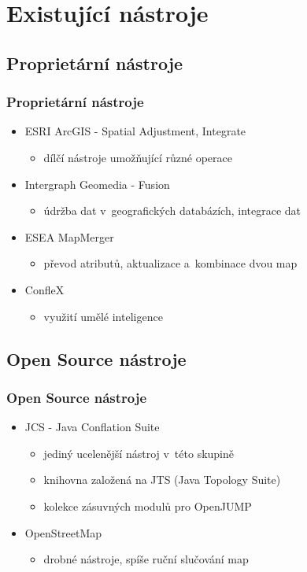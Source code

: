 \documentclass[unicode,bookmarksnumbered]{beamer}
\begin{document}
\section{Existující nástroje} %

  \subsection{Proprietární nástroje}
  \begin{frame}
    \frametitle{Proprietární nástroje}
     \begin{itemize}
      \item ESRI ArcGIS - Spatial Adjustment, Integrate
	  \begin{itemize}
	    \item dílčí nástroje umožňující různé operace
	  \end{itemize}
      \item Intergraph Geomedia - Fusion
	  \begin{itemize}
	    \item údržba dat v~geografických databázích, %
		  integrace dat
	  \end{itemize}
      \item ESEA MapMerger
	  \begin{itemize}
	    \item převod atributů, aktualizace a~kombinace dvou map
	  \end{itemize}
      \item ConfleX
	  \begin{itemize}
	    \item využití umělé inteligence%
	  \end{itemize}
     \end{itemize}
  \end{frame}

  \subsection{Open Source nástroje}
  \begin{frame}
    \frametitle{Open Source nástroje}
	\begin{itemize}
	  \item JCS - Java Conflation Suite
	      \begin{itemize}
		\item jediný ucelenější nástroj v~této skupině
		\item knihovna založená na JTS (Java Topology Suite)
		\item kolekce zásuvných modulů pro OpenJUMP %
	      \end{itemize}
	  \item OpenStreetMap
	      \begin{itemize}
		\item drobné nástroje, spíše ruční slučování map
	      \end{itemize}
	\end{itemize} 
  \end{frame}
\end{document}
